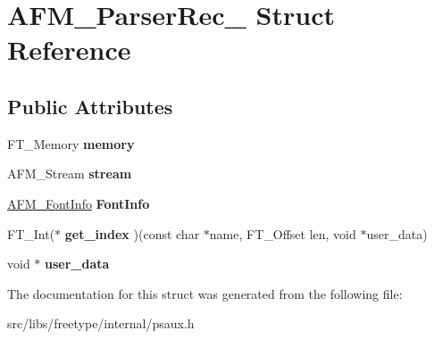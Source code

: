 \hypertarget{struct_a_f_m___parser_rec__}{
\section{AFM\_\-ParserRec\_\- Struct Reference}
\label{struct_a_f_m___parser_rec__}
}
\subsection*{Public Attributes}
\begin{DoxyCompactItemize}
\item 
\hypertarget{struct_a_f_m___parser_rec___a3fec8b1760fa9261f48ee87dc2b3858b}{
FT\_\-Memory {\bfseries memory}}
\label{struct_a_f_m___parser_rec___a3fec8b1760fa9261f48ee87dc2b3858b}

\item 
\hypertarget{struct_a_f_m___parser_rec___adf3b1165216cbd1f7ec7ae736fd4270a}{
AFM\_\-Stream {\bfseries stream}}
\label{struct_a_f_m___parser_rec___adf3b1165216cbd1f7ec7ae736fd4270a}

\item 
\hypertarget{struct_a_f_m___parser_rec___ae53d6cddac32a0eb7014c3a9f74517df}{
\hyperlink{struct_a_f_m___font_info_rec__}{AFM\_\-FontInfo} {\bfseries FontInfo}}
\label{struct_a_f_m___parser_rec___ae53d6cddac32a0eb7014c3a9f74517df}

\item 
\hypertarget{struct_a_f_m___parser_rec___a5f93c5c83d0957c19d3827071d90926f}{
FT\_\-Int($\ast$ {\bfseries get\_\-index} )(const char $\ast$name, FT\_\-Offset len, void $\ast$user\_\-data)}
\label{struct_a_f_m___parser_rec___a5f93c5c83d0957c19d3827071d90926f}

\item 
\hypertarget{struct_a_f_m___parser_rec___a9fa78a781737bf27e00448c5092b7657}{
void $\ast$ {\bfseries user\_\-data}}
\label{struct_a_f_m___parser_rec___a9fa78a781737bf27e00448c5092b7657}

\end{DoxyCompactItemize}


The documentation for this struct was generated from the following file:\begin{DoxyCompactItemize}
\item 
src/libs/freetype/internal/psaux.h\end{DoxyCompactItemize}
